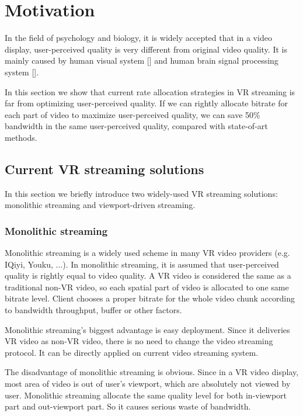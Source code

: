 \section{Motivation}

In the field of psychology and biology, it is widely accepted that in a video display, user-perceived quality is very different from original video quality. It is mainly caused by human visual system [] and human brain signal processing system [].

In this section we show that current rate allocation strategies in VR streaming is far from optimizing user-perceived quality. If we can rightly allocate bitrate for each part of video to maximize user-perceived quality, we can save 50\% bandwidth in the same user-perceived quality, compared with state-of-art methods.

\subsection{Current VR streaming solutions}

In this section we briefly introduce two widely-used VR streaming solutions: monolithic streaming and viewport-driven streaming.

\subsubsection{Monolithic streaming}

Monolithic streaming is a widely used scheme in many VR video providers (e.g. IQiyi, Youku, ...). In monolithic streaming, it is assumed that user-perceived quality is rightly equal to video quality. A VR video is considered the same as a traditional non-VR video, so each spatial part of video is allocated to one same bitrate level. Client chooses a proper bitrate for the whole video chunk according to bandwidth throughput, buffer or other factors.

Monolithic streaming's biggest advantage is easy deployment. Since it deliveries VR video as non-VR video, there is no need to change the video streaming protocol. It can be directly applied on current video streaming system.

The disadvantage of monolithic streaming is obvious. Since in a VR video display, most area of video is out of user's viewport, which are absolutely not viewed by user. Monolithic streaming allocate the same quality level for both in-viewport part and out-viewport part. So it causes serious waste of bandwidth. 


